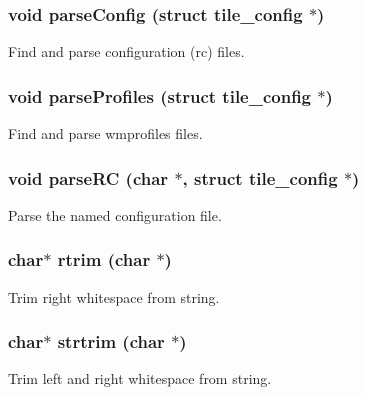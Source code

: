 \subsubsection{\setlength{\rightskip}{0pt plus 5cm}void parse\-Config (struct {\bf tile\_\-config} $\ast$)}\label{tilerc_8h_a13}


Find and parse configuration (rc) files. 

\subsubsection{\setlength{\rightskip}{0pt plus 5cm}void parse\-Profiles (struct {\bf tile\_\-config} $\ast$)}\label{tilerc_8h_a14}


Find and parse wmprofiles files. 

\subsubsection{\setlength{\rightskip}{0pt plus 5cm}void parse\-RC (char $\ast$, struct {\bf tile\_\-config} $\ast$)}\label{tilerc_8h_a15}


Parse the named configuration file. 

\subsubsection{\setlength{\rightskip}{0pt plus 5cm}char$\ast$ rtrim (char $\ast$)}\label{tilerc_8h_a11}


Trim right whitespace from string. 

\subsubsection{\setlength{\rightskip}{0pt plus 5cm}char$\ast$ strtrim (char $\ast$)}\label{tilerc_8h_a12}


Trim left and right whitespace from string. 


